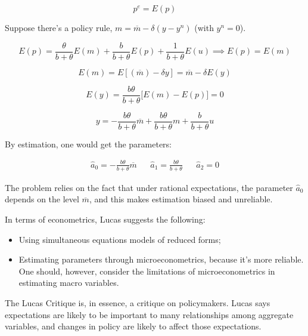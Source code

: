 \begin{equation*}
    p^e=E(p)
\end{equation*}

Suppose there's a policy rule, $m=\overline{m}-\delta(y-y^n)$ (with $y^n=0$). 

\begin{equation*}
    E(p)=\frac{\theta}{b+\theta}E(m) + \frac{b}{b+\theta}E(p)+\frac{1}{b+\theta}E(u) \implies E(p)=E(m)
\end{equation*}

\begin{equation*}
    E(m)=E[(\overline{m})-\delta y]=\overline{m}-\delta E(y)
\end{equation*}

\begin{equation*}
    E(y)=\frac{b\theta}{b+\theta}\bigg[E(m)-E(p) \bigg]=0
\end{equation*}

\begin{equation*}
    y=-\frac{b\theta}{b+\theta}\overline{m}+\frac{b\theta}{b+\theta}m+\frac{b}{b+\theta}u
\end{equation*}

By estimation, one would get the parameters: 

\begin{align*}
    \hat{a}_0=-\frac{b\theta}{b+\theta}\overline{m} && \hat{a}_1=\frac{b\theta}{b+\theta} &&\hat{a}_2=0
\end{align*}

The problem relies on the fact that under rational expectations, the parameter $\hat{a}_0$ depends on the level $\overline{m}$, and this makes estimation biased and unreliable. 

In terms of econometrics, Lucas suggests the following: 

\begin{itemize}
    \item Using simultaneous equations models of reduced forms;
    \item Estimating parameters through microeconometrics, because it's more reliable. One should, however, consider the limitations of microeconometrics in estimating macro variables. 
\end{itemize}

The Lucas Critique is, in essence, a critique on policymakers. Lucas says expectations are likely to be important to many relationships among aggregate variables, and changes in policy are likely to affect those expectations. 

